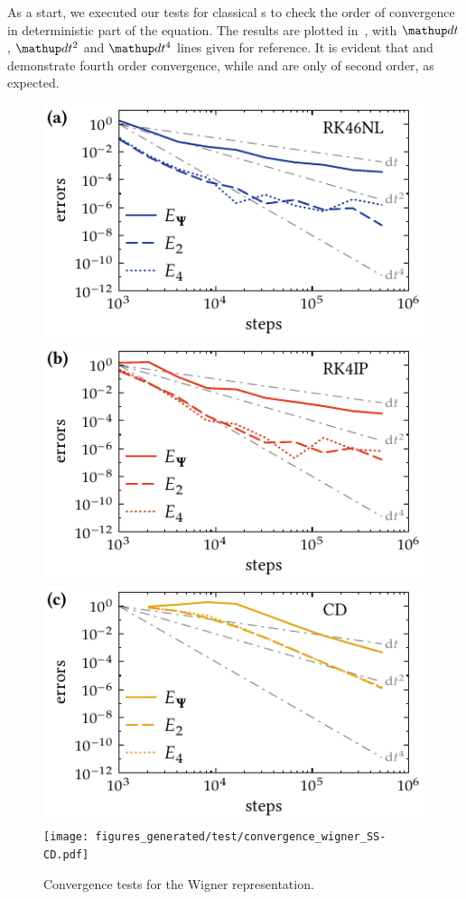 As a start, we executed our tests for classical s to check the order of convergence in deterministic part of the equation.
The results are plotted in~, with $\upd t$, $\upd t^2$ and $\upd t^4$ lines given for reference.
It is evident that  and  demonstrate fourth order convergence, while  and  are only of second order, as expected.

\begin{figure}
    \includegraphics{figures_generated/test/convergence_wigner_RK46NL.pdf}%
    \includegraphics{figures_generated/test/convergence_wigner_RK4IP.pdf}\\%
    \includegraphics{figures_generated/test/convergence_wigner_CD.pdf}%
    \texttt{[image: figures\_generated/test/convergence\_wigner\_SS-CD.pdf]}%

    \caption[Convergence tests, Wigner representation]{
    Convergence tests for the Wigner representation.}%

    \label{fig:numerical:convergence-wigner}
\end{figure}

